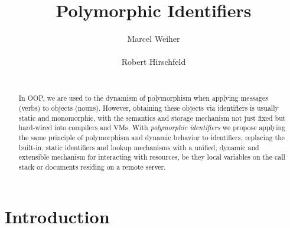 \documentclass[preprint,authoryear]{acm_proc_article-sp}
\begin{document}



\title{Polymorphic Identifiers}

\author{
\alignauthor Marcel Weiher\\
       \\
\alignauthor Robert Hirschfeld\\
       \\
       \email{}
}

\maketitle

\begin{abstract}

In OOP, we are used to the dynamism of polymorphism when applying messages (verbs) to objects (nouns).
However, obtaining these objects via identifiers is usually static and monomorphic, with the semantics
and storage mechanism not just fixed but hard-wired into compilers and VMs.  With {\em polymorphic identifiers}
we propose applying the same principle of polymorphism and dynamic behavior to identifiers, 
replacing the built-in, static identifiers and lookup mechanisms with a unified, dynamic and extensible mechanism
for interacting with resources, be they local variables on the call stack or documents residing on a remote
server.

\end{abstract}


\setlength{\epigraphrule}{0pt}


\section{Introduction}
\end{document}
